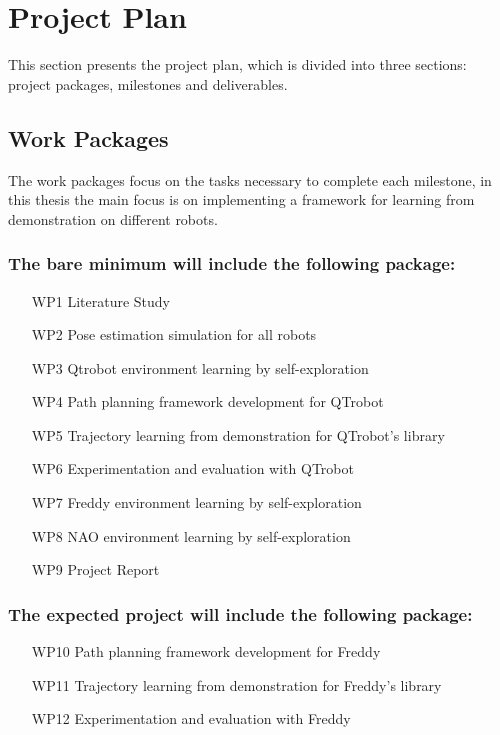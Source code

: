 \documentclass[thesis]{mas_proposal}
\begin{document}
\section{Project Plan}

	This section presents the project plan, which is divided into three sections: project packages, milestones and deliverables.

	\subsection{Work Packages}
	
	The work packages focus on the tasks necessary to complete each milestone, in this thesis the main focus is on implementing a framework for learning from demonstration on different robots.
	
	\subsubsection{The bare minimum will include the following package:}

		\begin{enumerate}
		    \item[WP1] Literature Study
		    \item[WP2] Pose estimation simulation for all robots
		    \item[WP3] Qtrobot environment learning by self-exploration
		    \item[WP4] Path planning framework development for QTrobot
		    \item[WP5] Trajectory learning from demonstration for QTrobot's library
		    \item[WP6] Experimentation and evaluation with QTrobot
		    \item[WP7] Freddy environment learning by self-exploration
		    \item[WP8] NAO environment learning by self-exploration
		    \item[WP9] Project Report
		\end{enumerate}
	
	\subsubsection{The expected project will include the following package:}
	
		\begin{enumerate}
			\item[WP10] Path planning framework development for Freddy
			\item[WP11] Trajectory learning from demonstration for Freddy's library
			\item[WP12] Experimentation and evaluation with Freddy
		\end{enumerate}
	
\end{document}
